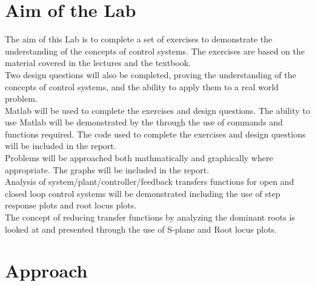 \documentclass[12pt]{article}
\begin{document}



\pagebreak

\tableofcontents


\pagebreak

\section{Aim of the Lab}\label{sec:aim}

The aim of this Lab is to complete a set of exercises to demonstrate the understanding of the concepts of control systems. The exercises are based on the material covered in the lectures and the textbook. \\

Two design questions will also be completed, proving the understanding of the concepts of control systems, and the ability to apply them to a real world problem.\\

Matlab will be used to complete the exercises and design questions. The ability to use Matlab will be demonstrated by the through the use of commands and functions required.
The code used to complete the exercises and design questions will be included in the report.\\

Problems will be approached both mathmatically and graphically where appropriate. The graphs will be included in the report. \\

Analysis of system/plant/controller/feedback transfers functions for open and closed loop control systems will be demonstrated including the use of step response plots and root locus plots.\\

The concept of reducing transfer functions by analyzing the dominant roots is looked at and presented through the use of S-plane and Root locus plots.\\


\section{Approach}\label{sec:approach}
\end{document}
